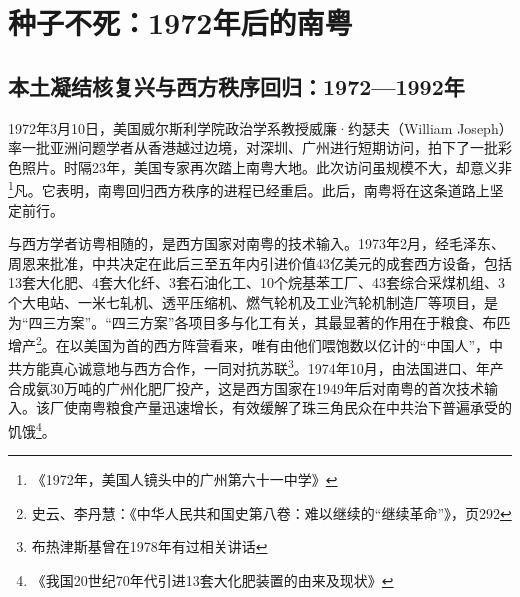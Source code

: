\chapter{种子不死：1972年后的南粤}

\section{本土凝结核复兴与西方秩序回归：1972—1992年}

1972年3月10日，美国威尔斯利学院政治学系教授威廉·约瑟夫（William Joseph）率一批亚洲问题学者从香港越过边境，对深圳、广州进行短期访问，拍下了一批彩色照片。时隔23年，美国专家再次踏上南粤大地。此次访问虽规模不大，却意义非\footnote{《1972年，美国人镜头中的广州第六十一中学》}凡。它表明，南粤回归西方秩序的进程已经重启。此后，南粤将在这条道路上坚定前行。

与西方学者访粤相随的，是西方国家对南粤的技术输入。1973年2月，经毛泽东、周恩来批准，中共决定在此后三至五年内引进价值43亿美元的成套西方设备，包括13套大化肥、4套大化纤、3套石油化工、10个烷基苯工厂、43套综合采煤机组、3个大电站、一米七轧机、透平压缩机、燃气轮机及工业汽轮机制造厂等项目，是为“四三方案”。“四三方案”各项目多与化工有关，其最显著的作用在于粮食、布匹增产\footnote{史云、李丹慧：《中华人民共和国史第八卷：难以继续的“继续革命”》，页292}。在以美国为首的西方阵营看来，唯有由他们喂饱数以亿计的“中国人”，中共方能真心诚意地与西方合作，一同对抗苏联\footnote{布热津斯基曾在1978年有过相关讲话}。1974年10月，由法国进口、年产合成氨30万吨的广州化肥厂投产，这是西方国家在1949年后对南粤的首次技术输入。该厂使南粤粮食产量迅速增长，有效缓解了珠三角民众在中共治下普遍承受的饥饿\footnote{《我国20世纪70年代引进13套大化肥装置的由来及现状》}。

